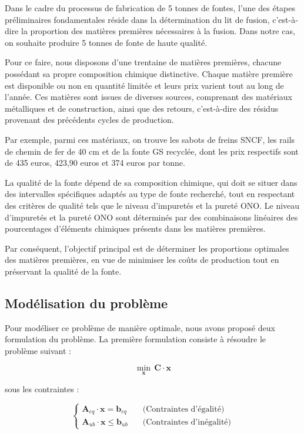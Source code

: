 \documentclass[12pt]{article}
\begin{document}
Dans le cadre du processus de fabrication de 5 tonnes de fontes, l'une des
étapes préliminaires fondamentales réside dans la détermination du lit de
fusion, c'est-à-dire la proportion des matières premières nécessaires à la 
fusion. Dans notre cas, on souhaite produire 5 tonnes de fonte de haute 
qualité.

Pour ce faire, nous disposons d'une trentaine de matières premières, 
chacune possédant sa propre composition chimique distinctive. Chaque 
matière première est disponible ou non en quantité limitée et leurs prix 
varient tout au long de l'année. Ces matières sont issues de diverses 
sources, comprenant des matériaux métalliques et de construction, ainsi 
que des retours, c'est-à-dire des résidus provenant des précédents cycles 
de production.

Par exemple, parmi ces matériaux, on trouve les sabots de freins SNCF, les 
rails de chemin de fer de 40 cm et de la fonte GS recyclée, dont les prix 
respectifs sont de 435 euros, 423,90 euros et 374 euros par tonne.

La qualité de la fonte dépend de sa composition chimique, qui doit se 
situer dans des intervalles spécifiques adaptés au type de fonte recherché,
tout en respectant des critères de qualité tels que le niveau d'impuretés 
et la pureté ONO. Le niveau d'impuretés et la pureté ONO sont déterminés 
par des combinaisons linéaires des pourcentages d'éléments chimiques 
présents dans les matières premières.

Par conséquent, l'objectif principal est de déterminer les proportions 
optimales des matières premières, en vue de minimiser les coûts de 
production tout en préservant la qualité de la fonte.






\subsection{Modélisation du problème }

Pour modéliser ce problème de manière optimale, nous avons proposé 
deux formulation du problème. La première formulation consiste à résoudre 
le problème suivant :

\[
\underset{\mathbf{x}}{\min} \, \mathbf{C} \cdot \mathbf{x}
\]

sous les contraintes :

$$
\begin{cases}
\mathbf{A}_{eq} \cdot \mathbf{x} = \mathbf{b}_{eq} \quad &\text{(Contraintes d'égalité)} \\
\mathbf{A}_{ub} \cdot \mathbf{x} \leq \mathbf{b}_{ub} \quad &\text{(Contraintes d'inégalité)}
\end{cases}
$$
\end{document}
